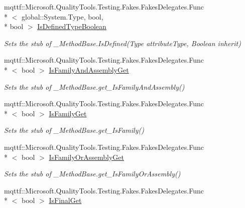 \begin{DoxyCompactItemize}
mqttf\-::\-Microsoft.\-Quality\-Tools.\-Testing.\-Fakes.\-Fakes\-Delegates.\-Func\\*
$<$ global\-::\-System.\-Type, bool, \\*
bool $>$ \hyperlink{class_system_1_1_runtime_1_1_interop_services_1_1_fakes_1_1_stub___method_base_a0becebff7306c3dde11b3de996eca3ac}{Is\-Defined\-Type\-Boolean}
\begin{DoxyCompactList}\small\item\em Sets the stub of \-\_\-\-Method\-Base.\-Is\-Defined(\-Type attribute\-Type, Boolean inherit)\end{DoxyCompactList}\item 
mqttf\-::\-Microsoft.\-Quality\-Tools.\-Testing.\-Fakes.\-Fakes\-Delegates.\-Func\\*
$<$ bool $>$ \hyperlink{class_system_1_1_runtime_1_1_interop_services_1_1_fakes_1_1_stub___method_base_ade46d758283d6e55e242e39a29bfc2cb}{Is\-Family\-And\-Assembly\-Get}
\begin{DoxyCompactList}\small\item\em Sets the stub of \-\_\-\-Method\-Base.\-get\-\_\-\-Is\-Family\-And\-Assembly()\end{DoxyCompactList}\item 
mqttf\-::\-Microsoft.\-Quality\-Tools.\-Testing.\-Fakes.\-Fakes\-Delegates.\-Func\\*
$<$ bool $>$ \hyperlink{class_system_1_1_runtime_1_1_interop_services_1_1_fakes_1_1_stub___method_base_a366805bfb99ef267bab7843770b6b259}{Is\-Family\-Get}
\begin{DoxyCompactList}\small\item\em Sets the stub of \-\_\-\-Method\-Base.\-get\-\_\-\-Is\-Family()\end{DoxyCompactList}\item 
mqttf\-::\-Microsoft.\-Quality\-Tools.\-Testing.\-Fakes.\-Fakes\-Delegates.\-Func\\*
$<$ bool $>$ \hyperlink{class_system_1_1_runtime_1_1_interop_services_1_1_fakes_1_1_stub___method_base_ae5b3c3048fac60accb55fb11f18cb3dd}{Is\-Family\-Or\-Assembly\-Get}
\begin{DoxyCompactList}\small\item\em Sets the stub of \-\_\-\-Method\-Base.\-get\-\_\-\-Is\-Family\-Or\-Assembly()\end{DoxyCompactList}\item 
mqttf\-::\-Microsoft.\-Quality\-Tools.\-Testing.\-Fakes.\-Fakes\-Delegates.\-Func\\*
$<$ bool $>$ \hyperlink{class_system_1_1_runtime_1_1_interop_services_1_1_fakes_1_1_stub___method_base_aee55ba0e31e16718b75ab367e3cadc29}{Is\-Final\-Get}

\end{DoxyCompactItemize}
